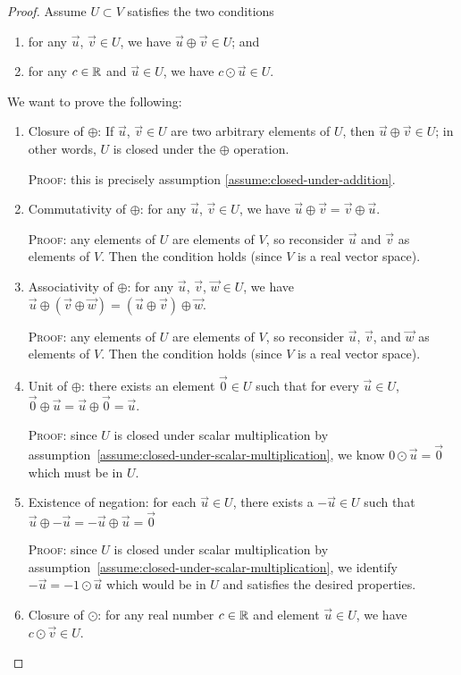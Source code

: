 \begin{proof}
Assume $U\subset V$ satisfies the two conditions
\begin{enumerate}[label=(\alph*)]
\item\label{assume:closed-under-addition} for any $\vec{u}$, $\vec{v}\in U$, we have
  $\vec{u}\oplus\vec{v}\in U$; and
\item\label{assume:closed-under-scalar-multiplication} for any $c\in\mathbb{R}$ and $\vec{u}\in U$, we have $c\odot\vec{u}\in U$.
\end{enumerate}
We want to prove the following:
\begin{enumerate}[label=(\arabic*)]
\item Closure of $\oplus$: If $\vec{u}$, $\vec{v}\in U$ are two arbitrary elements of $U$,
  then $\vec{u}\oplus\vec{v}\in U$; in other words, $U$ is closed under
  the $\oplus$ operation.

  \textsc{Proof:} this is precisely assumption \ref{assume:closed-under-addition}.
\item Commutativity of $\oplus$: for any $\vec{u}$, $\vec{v}\in U$,
  we have $\vec{u}\oplus\vec{v}=\vec{v}\oplus\vec{u}$.

  \textsc{Proof:} any elements of $U$ are elements of $V$, so reconsider
  $\vec{u}$ and $\vec{v}$ as elements of $V$. Then the condition holds
  (since $V$ is a real vector space).
\item Associativity of $\oplus$: for any $\vec{u}$, $\vec{v}$, $\vec{w}\in U$,
  we have $\vec{u}\oplus(\vec{v}\oplus\vec{w})=(\vec{u}\oplus\vec{v})\oplus\vec{w}$.

  \textsc{Proof:} any elements of $U$ are elements of $V$, so reconsider
  $\vec{u}$, $\vec{v}$, and $\vec{w}$ as elements of $V$. Then the
  condition holds (since $V$ is a real vector space).
\item Unit of $\oplus$: there exists an element $\vec{0}\in U$ such that
  for every $\vec{u}\in U$, $\vec{0}\oplus\vec{u}=\vec{u}\oplus\vec{0}=\vec{u}$.

  \textsc{Proof:} since $U$ is closed under scalar multiplication by assumption~\ref{assume:closed-under-scalar-multiplication}, we
  know $0\odot\vec{u}=\vec{0}$ which must be in $U$.
\item Existence of negation: for each $\vec{u}\in U$, there exists a
  $-\vec{u}\in U$ such that $\vec{u}\oplus-\vec{u}=-\vec{u}\oplus\vec{u}=\vec{0}$

  \textsc{Proof:} since $U$ is closed under scalar multiplication by assumption~\ref{assume:closed-under-scalar-multiplication}, we
  identify $-\vec{u} = -1\odot\vec{u}$ which would be in $U$ and
  satisfies the desired properties.
\item Closure of $\odot$: for any real number $c\in\mathbb{R}$ and element
  $\vec{u}\in U$, we have $c\odot\vec{v}\in U$.


\end{enumerate}
\end{proof}
